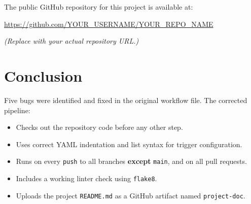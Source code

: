 \documentclass[11pt,a4paper]{article}
\begin{document}
The public GitHub repository for this project is available at:

\vspace{0.5em}
\noindent\url{https://github.com/YOUR_USERNAME/YOUR_REPO_NAME}

\textit{(Replace with your actual repository URL.)}

\section{Conclusion}

Five bugs were identified and fixed in the original workflow file. The corrected pipeline:

\begin{itemize}
    \item Checks out the repository code before any other step.
    \item Uses correct YAML indentation and list syntax for trigger configuration.
    \item Runs on every \texttt{push} to all branches \textbf{except} \texttt{main}, and on all pull requests.
    \item Includes a working linter check using \texttt{flake8}.
    \item Uploads the project \texttt{README.md} as a GitHub artifact named \texttt{project-doc}.
\end{itemize}
\end{document}
